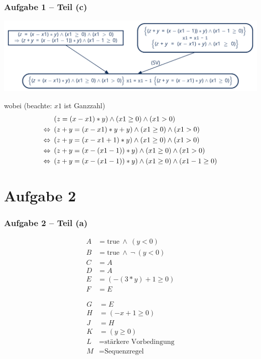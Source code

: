 \documentclass{beamer}
\newcommand{\logand}{ \ \land \ }
\begin{document}
\begin{frame} \frametitle{Aufgabe 1 -- Teil (c)}
	\begin{center}
		\includegraphics[width=\linewidth]{tut12-abb}
	\end{center}
	wobei (beachte: $x1$ ist Ganzzahl)
	\begin{align*}
		&(z = (x - x1) * y) \land (x1 \ge 0) \land (x1 > 0) \\
		\Leftrightarrow \enskip &(z + y = (x - x1) * y + y) \land (x1 \ge 0) \land (x1 > 0) \\
		\Leftrightarrow \enskip &(z + y = (x - x1 + 1) * y) \land (x1 \ge 0) \land (x1 > 0) \\
		\Leftrightarrow \enskip &(z + y = (x - (x1 - 1)) * y) \land (x1 \ge 0) \land (x1 > 0) \\
		\Leftrightarrow \enskip &(z + y = (x - (x1 - 1)) * y) \land (x1 \ge 0) \land (x1 - 1 \ge 0)
	\end{align*}
\end{frame}

\section{Aufgabe 2}

\begin{frame} \frametitle{Aufgabe 2 -- Teil (a)}
	\begin{minipage}{\dimexpr0.5\linewidth-\fboxrule-\fboxsep}
		\begin{align*}
			A &= \text{true} \logand (y < 0) \\
			B &= \text{true} \logand \lnot \ (y < 0) \\
			C &= A \\
			D &= A \\
			E &= ( -(3*y) + 1 \ge 0) \\
			F &= E 
		\end{align*}
	\end{minipage}
	\begin{minipage}{\dimexpr0.5\linewidth-\fboxrule-\fboxsep}
		\begin{align*}
		G &= E \\
		H &= (-x + 1 \ge 0) \\
		J &= H \\
		K &= (y \ge 0) \\
		L &= \text{stärkere Vorbedingung} \\
		M &= \text{Sequenzregel} 
		\end{align*}
	\end{minipage}	
\end{frame}
\end{document}
